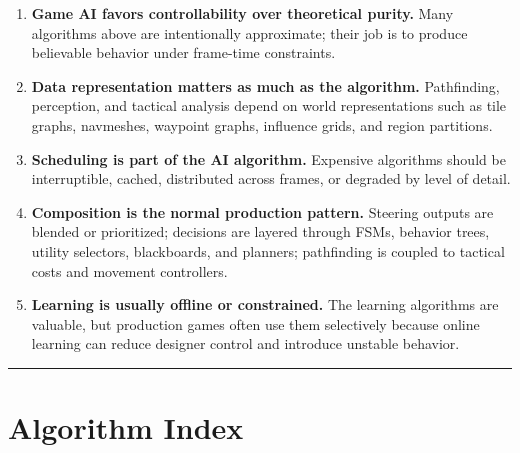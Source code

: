 \documentclass[10pt,letterpaper]{article}
\begin{document}
\begin{enumerate}
\item \textbf{Game AI favors controllability over theoretical purity.} Many algorithms above are intentionally approximate; their job is to produce believable behavior under frame-time constraints.
\item \textbf{Data representation matters as much as the algorithm.} Pathfinding, perception, and tactical analysis depend on world representations such as tile graphs, navmeshes, waypoint graphs, influence grids, and region partitions.
\item \textbf{Scheduling is part of the AI algorithm.} Expensive algorithms should be interruptible, cached, distributed across frames, or degraded by level of detail.
\item \textbf{Composition is the normal production pattern.} Steering outputs are blended or prioritized; decisions are layered through FSMs, behavior trees, utility selectors, blackboards, and planners; pathfinding is coupled to tactical costs and movement controllers.
\item \textbf{Learning is usually offline or constrained.} The learning algorithms are valuable, but production games often use them selectively because online learning can reduce designer control and introduce unstable behavior.
\end{enumerate}

\medskip\hrule\medskip

\clearpage
\section*{Algorithm Index}
\end{document}

